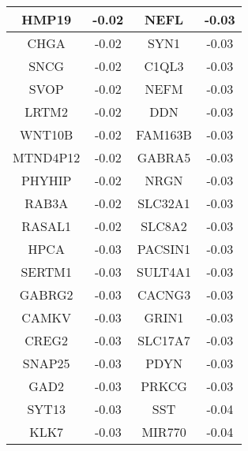 \begin{longtable}{|c|c||c|c|}
		\hline
		HMP19 & -0.02 & NEFL & -0.03 \\
		\hline
		CHGA & -0.02 & SYN1 & -0.03 \\
		\hline
		SNCG & -0.02 & C1QL3 & -0.03 \\
		\hline
		SVOP & -0.02 & NEFM & -0.03 \\
		\hline
		LRTM2 & -0.02 & DDN & -0.03 \\
		\hline
		WNT10B & -0.02 & FAM163B & -0.03 \\
		\hline
		MTND4P12 & -0.02 & GABRA5 & -0.03 \\
		\hline
		PHYHIP & -0.02 & NRGN & -0.03 \\
		\hline
		RAB3A & -0.02 & SLC32A1 & -0.03 \\
		\hline
		RASAL1 & -0.02 & SLC8A2 & -0.03 \\
		\hline
		HPCA & -0.03 & PACSIN1 & -0.03 \\
		\hline
		SERTM1 & -0.03 & SULT4A1 & -0.03 \\
		\hline
		GABRG2 & -0.03 & CACNG3 & -0.03 \\
		\hline
		CAMKV & -0.03 & GRIN1 & -0.03 \\
		\hline
		CREG2 & -0.03 & SLC17A7 & -0.03 \\
		\hline
		SNAP25 & -0.03 & PDYN & -0.03 \\
		\hline
		GAD2 & -0.03 & PRKCG & -0.03 \\
		\hline
		SYT13 & -0.03 & SST & -0.04 \\
		\hline
		KLK7 & -0.03 & MIR770 & -0.04 \\
		\hline
	\end{longtable}


